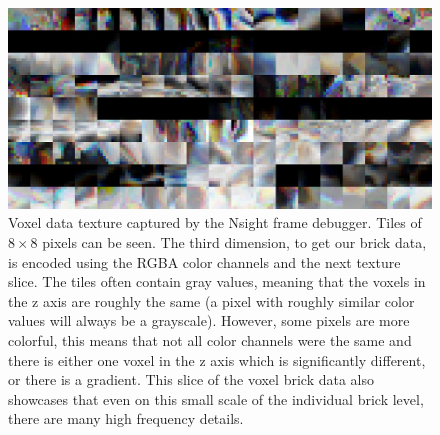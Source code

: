\begin{figure}[H]
    \centering
    \includegraphics[width=\linewidth]{figures/voxel_memory_view.png}
    \caption{Voxel data texture captured by the Nsight frame debugger. Tiles of $8\times 8$ pixels can be seen. The third dimension, to get our brick data, is encoded using the RGBA color channels and the next texture slice. The tiles often contain gray values, meaning that the voxels in the z axis are roughly the same (a pixel with roughly similar color values will always be a grayscale). However, some pixels are more colorful, this means that not all color channels were the same and there is either one voxel in the z axis which is significantly different, or there is a gradient. This slice of the voxel brick data also showcases that even on this small scale of the individual brick level, there are many high frequency details.}
    \label{fig:vdb_asset:memory_view}
\end{figure}


